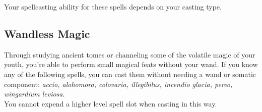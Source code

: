 \documentclass[a4paper,twocolumn,openany,nodeprecatedcode]{dndbook}
\begin{document}
        Your spellcasting ability for these spells depends on your casting type.


    \subsection{Wandless Magic}

        Through studying ancient tomes or channeling some of the volatile magic of your youth, you're able to perform small magical feats without your wand.
        If you know any of the following spells, you can cast them without needing a wand or somatic component: \textit{accio, alohomora, colovaria, illegibilus, incendio glacia, pereo, wingardium leviosa}.\\
        You cannot expend a higher level spell slot when casting in this way.
\end{document}
